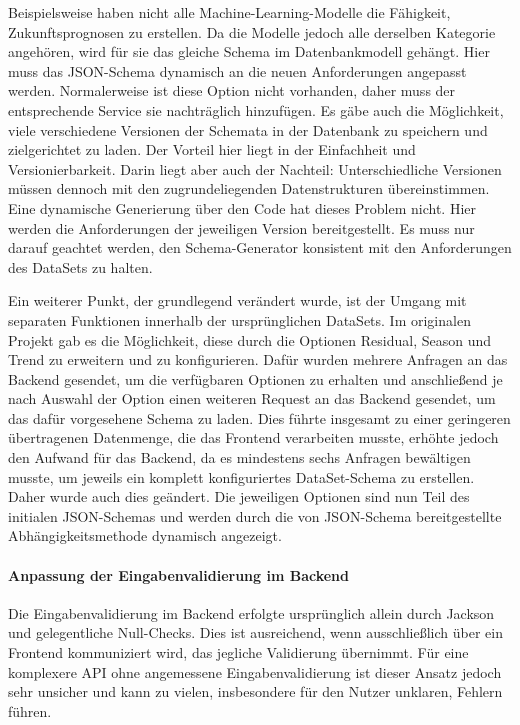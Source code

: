 Beispielsweise haben nicht alle Machine-Learning-Modelle die Fähigkeit, Zukunftsprognosen zu erstellen. Da die Modelle jedoch alle derselben Kategorie angehören, wird für sie das gleiche Schema im Datenbankmodell gehängt. 
Hier muss das JSON-Schema dynamisch an die neuen Anforderungen angepasst werden. Normalerweise ist diese Option nicht vorhanden, daher muss der entsprechende Service sie nachträglich hinzufügen. Es gäbe auch die Möglichkeit, 
viele verschiedene Versionen der Schemata in der Datenbank zu speichern und zielgerichtet zu laden. Der Vorteil hier liegt in der Einfachheit und Versionierbarkeit. Darin liegt aber auch der Nachteil: Unterschiedliche Versionen 
müssen dennoch mit den zugrundeliegenden Datenstrukturen übereinstimmen. Eine dynamische Generierung über den Code hat dieses Problem nicht. Hier werden die Anforderungen der jeweiligen Version bereitgestellt. Es muss nur darauf 
geachtet werden, den Schema-Generator konsistent mit den Anforderungen des DataSets zu halten.

Ein weiterer Punkt, der grundlegend verändert wurde, ist der Umgang mit separaten Funktionen innerhalb der ursprünglichen DataSets. Im originalen Projekt gab es die Möglichkeit, diese durch die Optionen Residual, Season und 
Trend zu erweitern und zu konfigurieren. Dafür wurden mehrere Anfragen an das Backend gesendet, um die verfügbaren Optionen zu erhalten und anschließend je nach Auswahl der Option einen weiteren Request an das Backend gesendet, 
um das dafür vorgesehene Schema zu laden. Dies führte insgesamt zu einer geringeren übertragenen Datenmenge, die das Frontend verarbeiten musste, erhöhte jedoch den Aufwand für das Backend, da es mindestens sechs Anfragen bewältigen musste, 
um jeweils ein komplett konfiguriertes DataSet-Schema zu erstellen. Daher wurde auch dies geändert. Die jeweiligen Optionen sind nun Teil des initialen JSON-Schemas und werden durch die von JSON-Schema bereitgestellte Abhängigkeitsmethode dynamisch angezeigt.

\paragraph{Anpassung der Eingabenvalidierung im Backend}
\label{sec:java_bean_validation}
Die Eingabenvalidierung im Backend erfolgte ursprünglich allein durch Jackson und gelegentliche Null-Checks. Dies ist ausreichend, wenn ausschließlich über ein Frontend kommuniziert wird, das jegliche Validierung übernimmt. 
Für eine komplexere API ohne angemessene Eingabenvalidierung ist dieser Ansatz jedoch sehr unsicher und kann zu vielen, insbesondere für den Nutzer unklaren, Fehlern führen.

